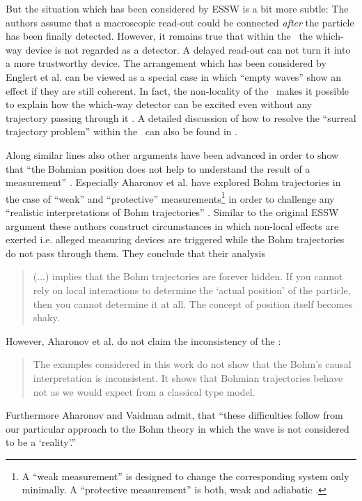 But the situation which has 
been considered by ESSW is a bit more subtle: The authors assume that a macroscopic 
read-out could be connected {\em after} the particle has been finally detected. 
However, it remains true that within the \dbb\ the  which-way device is not regarded as a detector. 
A delayed read-out can not turn it into a more trustworthy device.  The arrangement which has been considered by Englert et al. can 
be viewed as a special case in which
``empty waves'' \cite{hardy} show an effect if they are still coherent. In fact, the non-locality of the \dbb\ makes it 
possible to explain how the which-way detector can be excited even without any trajectory passing through it \cite{dhs,hcm}.
A detailed discussion of how to resolve the ``surreal trajectory problem'' 
within the \dbb\ can also be found in \cite{barrett}. 

Along similar lines also other arguments have been advanced in order to show that ``the Bohmian position does not help to understand the 
result of a measurement'' \cite{ahavaid}. Especially Aharonov et al. \cite{ahavaid,aes,aes2} have 
explored Bohm trajectories in the case of ``weak'' and ``protective'' measurements\footnote{A ``weak measurement'' \cite{wm} is designed 
to change the corresponding system only minimally. A ``protective measurement'' is both, weak and adiabatic \cite{aes}.} 
in order to challenge any ``realistic interpretations of 
Bohm trajectories'' \cite{aes}. Similar to the original ESSW argument these authors construct circumstances in which non-local effects
are exerted i.e.  alleged measuring devices are triggered while the Bohm trajectories do not pass through them. They conclude that 
their analysis 
\begin{quote}
(...) implies that the Bohm trajectories are forever hidden. If you cannot rely on local interactions to determine the `actual position' 
of the particle, then you cannot determine it at all. The concept of position itself becomes shaky. \cite{aes}
\end{quote}
However, Aharonov et al. do not claim the inconsistency of the \dbb:
\begin{quote}
The examples considered in this work do not show that the Bohm's causal interpretation is inconsistent. It shows that Bohmian 
trajectories behave not as we would expect from a classical type model. \cite{ahavaid} 
\end{quote}
Furthermore Aharonov and Vaidman admit, that ``these difficulties follow from our particular approach to the Bohm theory in which the 
wave is not considered to be a `reality'.''

